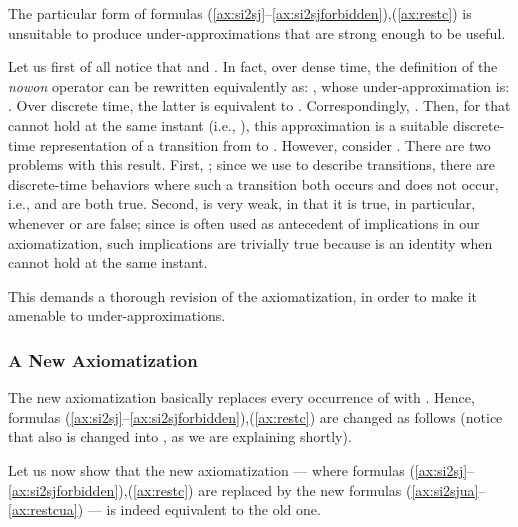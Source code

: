 \documentclass[a4paper]{article}
\newcommand{\frf}[1]{(\ref{#1})}
\newcommand{\fsrf}[2]{(\ref{#1}--\ref{#2})}
\theoremstyle{plain}
\theoremstyle{definition}
\begin{document}
The particular form of formulas \fsrf{ax:si2sj}{ax:si2sjforbidden},\frf{ax:restc} is unsuitable to produce under-ap\-prox\-i\-ma\-tions that are strong enough to be useful.

Let us first of all notice that  and .
In	fact, over dense time, the definition of the \emph{nowon} operator can be rewritten equivalently as: , whose under-ap\-prox\-i\-ma\-tion is: .
	 Over discrete time, the latter is equivalent to . 
Correspondingly, .
Then, for  that cannot hold at the same instant (i.e., ), this approximation is a suitable discrete-time representation of a transition from  to .
However, consider .
There are two problems with this result.
First, ; since we use  to describe transitions, there are discrete-time behaviors where such a transition both occurs and does not occur, i.e.,  and  are both true.
Second,  is very weak, in that it is true, in particular, whenever  or  are false; since  is often used as antecedent of implications in our axiomatization, such implications are trivially true because  is an identity when  cannot hold at the same instant.

This demands a thorough revision of the axiomatization, in order to make it amenable to under-approximations.



\subsubsection{A New Axiomatization}
The new axiomatization basically replaces every occurrence of  with .
Hence, formulas \fsrf{ax:si2sj}{ax:si2sjforbidden},\frf{ax:restc} are changed as follows (notice that also  is changed into , as we are explaining shortly).










Let us now show that the new axiomatization --- where formulas \fsrf{ax:si2sj}{ax:si2sjforbidden},\frf{ax:restc} are replaced by the new formulas \fsrf{ax:si2sjua}{ax:restcua} --- is indeed equivalent to the old one.
\end{document}
